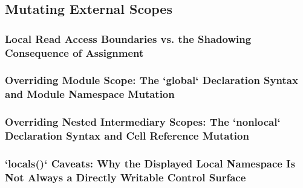 \subsection{Mutating External Scopes}
\subsubsection{Local Read Access Boundaries vs. the Shadowing Consequence of Assignment}
\subsubsection{Overriding Module Scope: The `global` Declaration Syntax and Module Namespace Mutation}
\subsubsection{Overriding Nested Intermediary Scopes: The `nonlocal` Declaration Syntax and Cell Reference Mutation}
\subsubsection{`locals()` Caveats: Why the Displayed Local Namespace Is Not Always a Directly Writable Control Surface}
